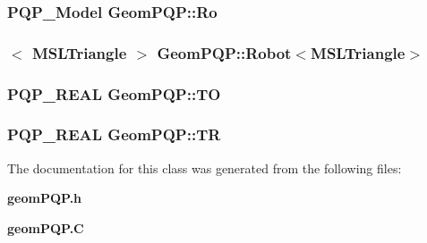 \subsubsection{\setlength{\rightskip}{0pt plus 5cm}PQP\_\-Model Geom\-PQP::Ro}\label{classGeomPQP_m2}


\subsubsection{$<$ {\bf MSLTriangle} $>$ Geom\-PQP::Robot$<${\bf MSLTriangle}$>$}\label{classGeomPQP_m1}


\subsubsection{\setlength{\rightskip}{0pt plus 5cm}PQP\_\-REAL Geom\-PQP::TO\hspace{0.3cm}{\tt  [protected]}}\label{classGeomPQP_n3}


\subsubsection{\setlength{\rightskip}{0pt plus 5cm}PQP\_\-REAL Geom\-PQP::TR\hspace{0.3cm}{\tt  [protected]}}\label{classGeomPQP_n2}




The documentation for this class was generated from the following files:\begin{CompactItemize}
\item 
{\bf geom\-PQP.h}\item 
{\bf geom\-PQP.C}\end{CompactItemize}
